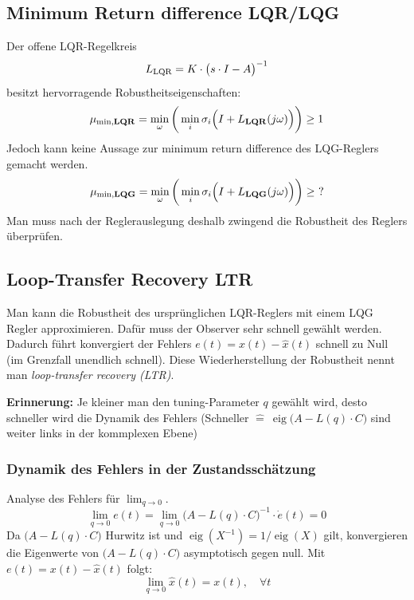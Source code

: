 \subsection{Minimum Return difference LQR/LQG}
Der offene LQR-Regelkreis 
\begin{equation*}
    L_{\textnormal{LQR}} = K\cdot \big(s\cdot I - A\big)^{-1}
\end{equation*}
besitzt hervorragende Robustheitseigenschaften:
\begin{equation*}
    \mu_{\textnormal{min,\textbf{LQR}}} = \min_\omega\bigg( \min_i\sigma_i\Big(I + L_{\textnormal{\textbf{LQR}}}(j\omega)\Big)\bigg) \geq 1
\end{equation*}
Jedoch kann keine Aussage zur minimum return difference des LQG-Reglers gemacht werden.
\begin{equation*}
    \mu_{\textnormal{min,\textbf{LQG}}} = \min_\omega\bigg( \min_i\sigma_i\Big(I + L_{\textnormal{\textbf{LQG}}}(j\omega)\Big)\bigg) \geq \ ?
\end{equation*}
Man muss nach der Reglerauslegung deshalb zwingend die Robustheit des Reglers überprüfen.

\subsection{Loop-Transfer Recovery LTR}
    Man kann die Robustheit des ursprünglichen LQR-Reglers mit einem LQG Regler approximieren. Dafür muss der Observer sehr schnell gewählt werden. Dadurch führt konvergiert der Fehlers $e(t) = x(t)- \widehat{x}(t)$ schnell zu Null (im Grenzfall unendlich schnell). Diese Wiederherstellung der Robustheit nennt man \textit{loop-transfer recovery (LTR)}.
    
    \textbf{Erinnerung:} Je kleiner man den tuning-Parameter $q$ gewählt wird, desto schneller wird die Dynamik des Fehlers (Schneller $\widehat{=} \ \operatorname{eig}\big(A - L(q)\cdot C\big)$ sind weiter links in der kommplexen Ebene)
    
    \subsubsection{Dynamik des Fehlers in der Zustandsschätzung}
        Analyse des Fehlers für $\displaystyle\lim_{q\to0}$.
        \begin{equation*}
            \lim_{q\to0}e(t) = \lim_{q\to0}\big(A - L(q)\cdot C\big)^{-1}\cdot\Dot{e}(t) = 0
        \end{equation*}
        Da $\big(A - L(q)\cdot C\big)$ Hurwitz ist und $\operatorname{eig}(X^{-1}) = 1/\operatorname{eig}(X)$ gilt,  konvergieren die Eigenwerte von $\big(A - L(q)\cdot C\big)$ asymptotisch gegen null. Mit $e(t) = x(t) - \widehat{x}(t)$ folgt:
        \begin{equation*}
            \lim_{q\to0} \widehat{x}(t) = x(t), \quad \forall t
        \end{equation*}
        
